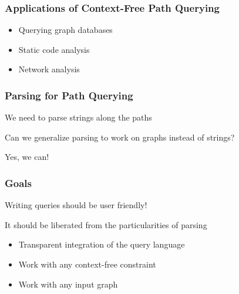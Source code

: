 \documentclass[xcolor=table]{beamer}
\begin{document}
\begin{frame}[fragile]
  \transwipe[direction=90]
  \frametitle{Applications of Context-Free Path Querying}
\begin{itemize}
	\item Querying graph databases
	\item Static code analysis
	\item Network analysis
\end{itemize}
\end{frame}


\begin{frame}[fragile]
  \transwipe[direction=90]
  \frametitle{Parsing for Path Querying}

We need to parse strings along the paths

\bigskip 

Can we generalize parsing to work on graphs instead of strings?

\pause

\bigskip

Yes, we can!

\end{frame}

%
%
%
%  
%
%
%
%
%
%  
%
%
%
%
%
%  
%
%
%

 
\begin{frame}
  \transwipe[direction=90]
  \frametitle{Goals}

Writing queries should be user friendly!

It should be liberated from the particularities of parsing
 
\begin{itemize}
  \item Transparent integration of the query language
  \item Work with any context-free constraint
  \item Work with any input graph
\end{itemize}
  
\end{frame}
\end{document}
